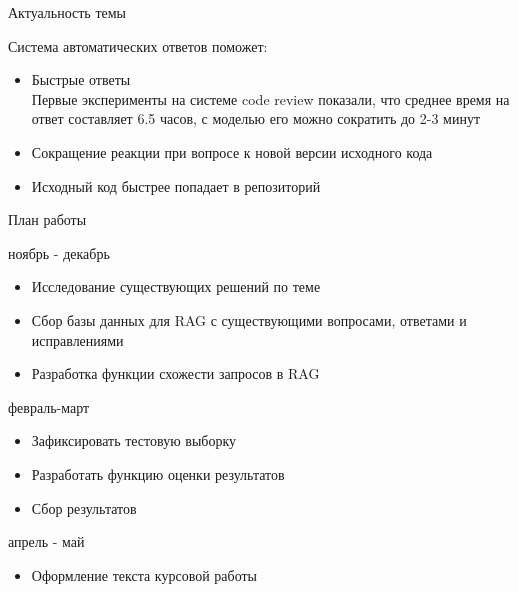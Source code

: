 \documentclass[aspectratio=169, fontsize=18pt]{beamer}
\begin{document}
\begin{frame}{Актуальность темы}
\begin{block}{Система автоматических ответов поможет:}
    \begin{itemize}
        \item Быстрые ответы\\
        \textcolor{msugray}{Первые эксперименты на системе code review показали, что среднее время на ответ составляет 6.5 часов, с моделью его можно сократить до 2-3 минут}
        \item Сокращение реакции при вопросе к новой версии исходного кода
        \item Исходный код быстрее попадает в репозиторий
    \end{itemize}
\end{block}
\end{frame}

\begin{frame}{План работы}
\begin{block}{ноябрь - декабрь}
    \begin{itemize}
        \item Исследование существующих решений по теме 
        \item Сбор базы данных для RAG с существующими вопросами, ответами и исправлениями
        \item Разработка функции схожести запросов в RAG
    \end{itemize}
\end{block}

\begin{block}{февраль-март}
    \begin{itemize}
        \item Зафиксировать тестовую выборку
        \item Разработать функцию оценки результатов
        \item Сбор результатов
    \end{itemize}
\end{block}

\begin{block}{апрель - май}
    \begin{itemize}
        \item Оформление текста курсовой работы
    \end{itemize}
\end{block}

\end{frame}
\end{document}
